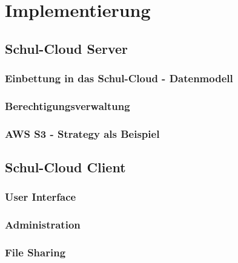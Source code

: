 \section{Implementierung}
\label{sec:implementation}

\subsection{Schul-Cloud Server}
\subsubsection{Einbettung in das Schul-Cloud - Datenmodell}
\subsubsection{Berechtigungsverwaltung}
\subsubsection{AWS S3 - Strategy als Beispiel}

\subsection{Schul-Cloud Client}
\subsubsection{User Interface}
\subsubsection{Administration}
\subsubsection{File Sharing}

\clearpage
